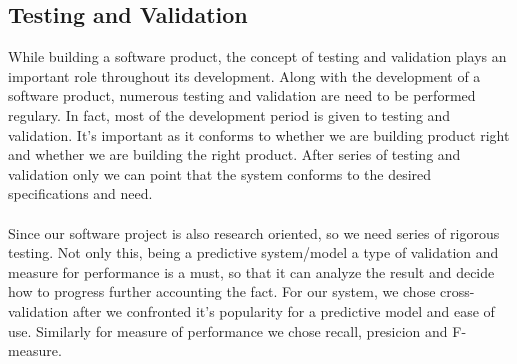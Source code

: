 {\subsection{Testing and Validation}
While building a software product, the concept of testing and validation plays an important role throughout its development.
Along with the development of a software product, numerous testing and validation are need to be performed regulary.
In fact, most of the development period is given to testing and validation. It's important as it conforms to whether we are building
product right and whether we are building the right product. After series of testing and validation only we can point that the system
conforms to the desired specifications and need.\\
\\
Since our software project is also research oriented, so we need series of rigorous testing. Not only this, being a predictive system/model
a type of validation and measure for performance is a must, so that it can analyze the result and decide how to progress further accounting the fact.
For our system, we chose cross-validation after we confronted it's popularity for a predictive model and ease of use. Similarly for measure of performance we chose recall, presicion 
and F-measure.\\

}

